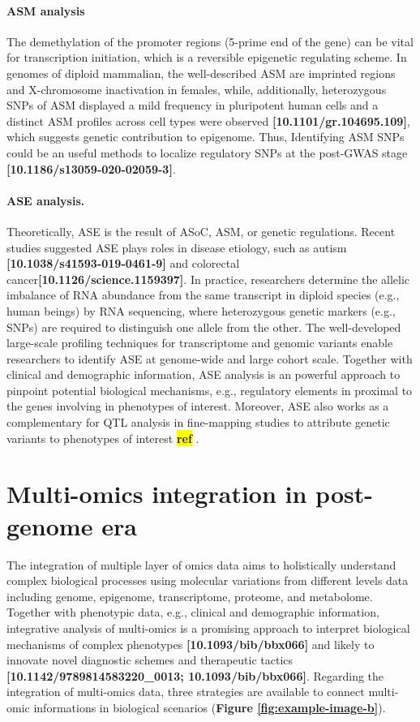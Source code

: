 \documentclass[12pt,usletter, fancy]{elegantbook}
\newcommand{\reqref}[1][ref]{
  \colorbox{yellow}{\textbf{#1}}
}
\begin{document}
\paragraph*{ASM analysis}
The demethylation of the promoter regions (5-prime end of the gene) can be vital for transcription initiation, which is a reversible epigenetic regulating scheme.
In genomes of diploid mammalian, the well-described ASM are imprinted regions and X-chromosome inactivation in females, while, additionally, heterozygous SNPs of ASM displayed a mild frequency in pluripotent human cells and a distinct ASM profiles across cell types were observed \textbf{[10.1101/gr.104695.109]}, which suggests genetic contribution to epigenome.
Thus, Identifying ASM SNPs could be an useful methods to localize regulatory SNPs at the post-GWAS stage \textbf{[10.1186/s13059-020-02059-3]}.

\paragraph*{ASE analysis.}
Theoretically, ASE is the result of ASoC, ASM, or genetic regulations.
Recent studies suggested ASE plays roles in disease etiology, such as autism \textbf{[10.1038/s41593-019-0461-9]} and colorectal cancer\textbf{[10.1126/science.1159397]}.
In practice, researchers determine the allelic imbalance of RNA abundance from the same transcript in diploid species (e.g., human beings) by RNA sequencing, where heterozygous genetic markers (e.g., SNPs) are required to distinguish one allele from the other.
The well-developed large-scale profiling techniques for transcriptome and genomic variants enable researchers to identify ASE at genome-wide and large cohort scale.
Together with clinical and demographic information, ASE analysis is an powerful approach to pinpoint potential biological mechanisms, e.g., regulatory elements in proximal to the genes involving in phenotypes of interest.
Moreover, ASE also works as a complementary for QTL analysis in fine-mapping studies to attribute genetic variants to phenotypes of interest\reqref.

\section*{Multi-omics integration in post-genome era}
The integration of multiple layer of omics data aims to holistically understand complex biological processes using molecular variations from different levels data including genome, epigenome, transcriptome, proteome, and metabolome.
Together with phenotypic data, e.g., clinical and demographic information, integrative analysis of multi-omics is a promising approach to interpret biological mechanisms of complex phenotypes \textbf{[10.1093/bib/bbx066]} and likely to innovate novel diagnostic schemes and therapeutic tactics \textbf{[10.1142/9789814583220\_0013; 10.1093/bib/bbx066]}.
Regarding the integration of multi-omics data, three strategies are available to connect multi-omic informations in biological scenarios (\textbf{Figure \ref{fig:example-image-b}}).
\end{document}
